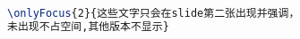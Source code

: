 \begin{lstlisting}[language=tex]
\onlyFocus{2}{这些文字只会在slide第二张出现并强调，
未出现不占空间,其他版本不显示}
\end{lstlisting}
